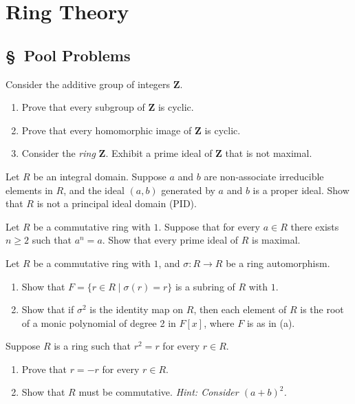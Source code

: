 \documentclass[11pt,twoside,openany]{memoir}
\begin{document}
\chapter*{Ring Theory}
\section*{\S\ Pool Problems}
\begin{exercise}
    Consider the additive group of integers $\mathbf{Z}$.
    \begin{enumerate}[label=(\alph*)]
        \item Prove that every subgroup of $\mathbf{Z}$ is cyclic.
        \item Prove that every homomorphic image of $\mathbf{Z}$ is cyclic.
        \item Consider the \textit{ring} $\mathbf{Z}$. Exhibit a prime ideal of $\mathbf{Z}$ that is not maximal.
    \end{enumerate}
    \end{exercise}
    
    \begin{exercise}
    Let $R$ be an integral domain. Suppose $a$ and $b$ are non-associate irreducible elements in $R$, and the ideal $(a,b)$ generated by $a$ and $b$ is a proper ideal. Show that $R$ is not a principal ideal domain (PID).
    \end{exercise}
    
    \begin{exercise}
    Let $R$ be a commutative ring with $1$. Suppose that for every $a\in R$ there exists $n\ge 2$ such that $a^n=a$. Show that every prime ideal of $R$ is maximal.
    \end{exercise}
    
    \begin{exercise}
    Let $R$ be a commutative ring with $1$, and $\sigma:R\to R$ be a ring automorphism.
    \begin{enumerate}[label=(\alph*)]
        \item Show that $F=\{r\in R\mid \sigma(r)=r\}$ is a subring of $R$ with $1$.
        \item Show that if $\sigma^2$ is the identity map on $R$, then each element of $R$ is the root of a monic polynomial of degree 2 in $F[x]$, where $F$ is as in (a).
    \end{enumerate}
    \end{exercise}
    
    \begin{exercise}
    Suppose $R$ is a ring such that $r^2=r$ for every $r\in R$.
    \begin{enumerate}[label=(\alph*)]
        \item Prove that $r=-r$ for every $r\in R$.
        \item Show that $R$ must be commutative. \textit{Hint: Consider $(a+b)^2$.}
    \end{enumerate}
    \end{exercise}
    
\end{document}
